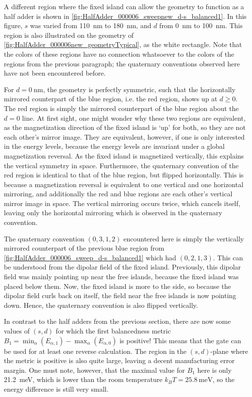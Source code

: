 \documentclass[11pt,a4paper,english]{article}
\begin{document}
A different region where the fixed island can allow the geometry to function as a half adder is shown in \cref{fig:HalfAdder_000006_sweepnew_d-s_balanced1}. In this figure, $s$ was varied from \SI{110}{\nano\metre} to \SI{180}{\nano\metre}, and $d$ from \SI{0}{\nano\metre} to \SI{100}{\nano\metre}. This region is also illustrated on the geometry of \cref{fig:HalfAdder_000006new_geometryTypical}, as the white rectangle. Note that the colors of these regions have no connection whatsoever to the colors of the regions from the previous paragraph; the quaternary conventions observed here have not been encountered before. \par
For $d=\SI{0}{\nano\metre}$, the geometry is perfectly symmetric, such that the horizontally mirrored counterpart of the blue region, i.e. the red region, shows up at $d \geq 0$. The red region is simply the mirrored counterpart of the blue region about the $d=0$ line. At first sight, one might wonder why these two regions are equivalent, as the magnetization direction of the fixed island is `up' for both, so they are not each other's mirror image. They are equivalent, however, if one is only interested in the energy levels, because the energy levels are invariant under a global magnetization reversal. As the fixed island is magnetized vertically, this explains the vertical symmetry in space. Furthermore, the quaternary convention of the red region is identical to that of the blue region, but flipped horizontally. This is because a magnetization reversal is equivalent to one vertical and one horizontal mirroring, and additionally the red and blue regions are each other's vertical mirror image in space. The vertical mirroring occurs twice, which cancels itself, leaving only the horizontal mirroring which is observed in the quaternary convention. \par
The quaternary convention $(0,3,1,2)$ encountered here is simply the vertically mirrored counterpart of the previous blue region from \cref{fig:HalfAdder_000006_sweep_d-s_balanced1} which had $(0,2,1,3)$. This can be understood from the dipolar field of the fixed island. Previously, this dipolar field was mainly pointing up near the free islands, because the fixed island was placed below them. Now, the fixed island is more to the side, so because the dipolar field curls back on itself, the field near the free islands is now pointing down. Hence, the quaternary convention is also flipped vertically. \par
In contrast to the half adders from the previous section, there are now some values of $(s,d)$ for which the first balancedness metric $B_1 = \min_\alpha(E_{\alpha,1}) - \max_\alpha(E_{\alpha,0})$ is positive! This means that the gate can be used for at least one reverse calculation. The region in the $(s,d)$-plane where the metric is positive is also quite large, leaving a decent manufacturing error margin. One must note, however, that the maximal value for $B_1$ here is only \SI{21.2}{\milli\electronvolt}, which is lower than the room temperature $k_B T = \SI{25.8}{\milli\electronvolt}$, so the energy difference is still very small. \par
\end{document}
